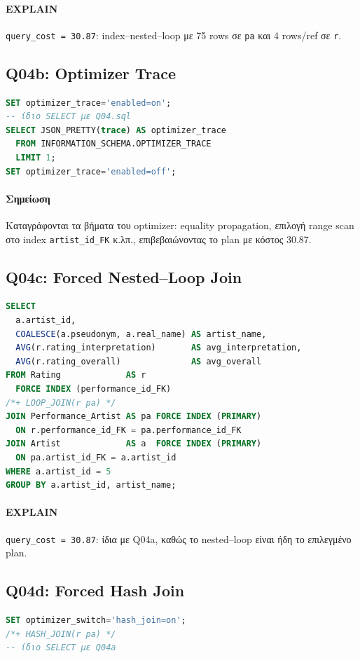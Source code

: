 \documentclass[a4paper,12pt]{article}
\begin{document}
\paragraph{EXPLAIN}  
\texttt{query\_cost = 30.87}: index–nested–loop με 75 rows σε \texttt{pa} και 4 rows/ref σε \texttt{r}.

\subsection{Q04b: Optimizer Trace}
\begin{lstlisting}[language=SQL]
SET optimizer_trace='enabled=on';
-- ίδιο SELECT με Q04.sql
SELECT JSON_PRETTY(trace) AS optimizer_trace
  FROM INFORMATION_SCHEMA.OPTIMIZER_TRACE
  LIMIT 1;
SET optimizer_trace='enabled=off';
\end{lstlisting}

\paragraph{Σημείωση}  
Καταγράφονται τα βήματα του optimizer: equality propagation, επιλογή range scan στο index \texttt{artist\_id\_FK} κ.λπ., επιβεβαιώνοντας το plan με κόστος 30.87.

\subsection{Q04c: Forced Nested–Loop Join}
\begin{lstlisting}[language=SQL]
SELECT
  a.artist_id,
  COALESCE(a.pseudonym, a.real_name) AS artist_name,
  AVG(r.rating_interpretation)       AS avg_interpretation,
  AVG(r.rating_overall)              AS avg_overall
FROM Rating             AS r
  FORCE INDEX (performance_id_FK)
/*+ LOOP_JOIN(r pa) */
JOIN Performance_Artist AS pa FORCE INDEX (PRIMARY)
  ON r.performance_id_FK = pa.performance_id_FK
JOIN Artist             AS a  FORCE INDEX (PRIMARY)
  ON pa.artist_id_FK = a.artist_id
WHERE a.artist_id = 5
GROUP BY a.artist_id, artist_name;
\end{lstlisting}

\paragraph{EXPLAIN}  
\texttt{query\_cost = 30.87}: ίδια με Q04a, καθώς το nested–loop είναι ήδη το επιλεγμένο plan.

\subsection{Q04d: Forced Hash Join}
\begin{lstlisting}[language=SQL]
SET optimizer_switch='hash_join=on';
/*+ HASH_JOIN(r pa) */
-- ίδιο SELECT με Q04a
\end{lstlisting}
\end{document}
